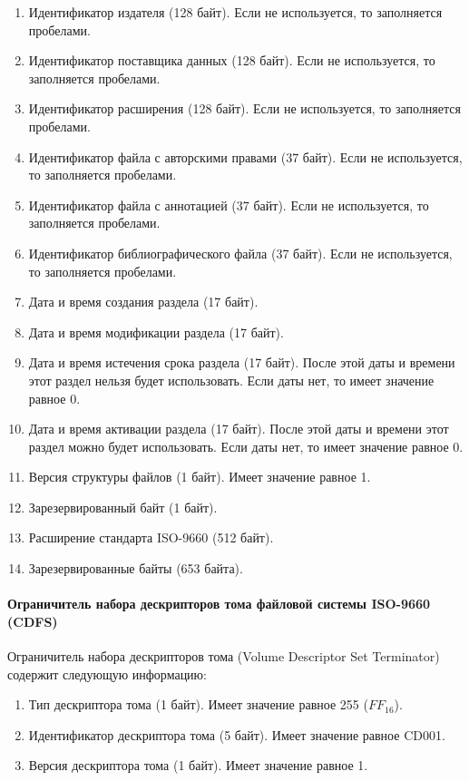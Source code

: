\begin{enumerate}
\item Идентификатор издателя (128 байт). Если не используется, то заполняется пробелами.
\item Идентификатор поставщика данных (128 байт). Если не используется, то заполняется пробелами.
\item Идентификатор расширения (128 байт). Если не используется, то заполняется пробелами.
\item Идентификатор файла с авторскими правами (37 байт). Если не используется, то заполняется пробелами.
\item Идентификатор файла с аннотацией (37 байт). Если не используется, то заполняется пробелами.
\item Идентификатор библиографического файла (37 байт). Если не используется, то заполняется пробелами.
\item Дата и время создания раздела (17 байт).
\item Дата и время модификации раздела (17 байт).
\item Дата и время истечения срока раздела (17 байт). После этой даты и времени этот раздел нельзя будет использовать. Если даты нет, то имеет значение равное 0.
\item Дата и время активации раздела (17 байт). После этой даты и времени этот раздел можно будет использовать. Если даты нет, то имеет значение равное 0.
\item Версия структуры файлов (1 байт). Имеет значение равное 1.
\item Зарезервированный байт (1 байт).
\item Расширение стандарта ISO-9660 (512 байт).
\item Зарезервированные байты (653 байта).
\end{enumerate}

\paragraph{Ограничитель набора дескрипторов тома файловой системы ISO-9660 (CDFS)}

Ограничитель набора дескрипторов тома (Volume Descriptor Set Terminator) содержит следующую информацию:

\begin{enumerate}
\item Тип дескриптора тома (1 байт). Имеет значение равное 255 ($FF_{16}$).
\item Идентификатор дескриптора тома (5 байт). Имеет значение равное \textquotedbl CD001\textquotedbl.
\item Версия дескриптора тома (1 байт). Имеет значение равное 1.
\end{enumerate}

